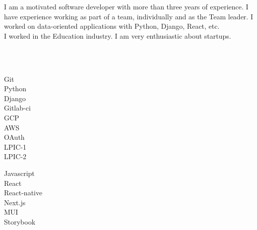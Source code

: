 \documentclass[9pt]{developercv}
\begin{document}
\begin{minipage}[t]{1\textwidth}
	\vspace{-\baselineskip}
	I am a motivated software developer with more than three years of experience.
	I have experience working as part of a team, individually and as the Team leader.
	I worked on data-oriented applications with Python, Django, React, etc.\\
	I worked in the Education industry. I am very enthusiastic about startups.
\end{minipage}

\\\\
\begin{minipage}[t]{0.49\textwidth}
	\Large
	\vspace{-\baselineskip}

	\faCircle \; {Git}\\
	\faCircle \; {Python}\\
	\faCircle \; {Django}\\
	\faCircle \; {Gitlab-ci}\\
	\faCircle \; {GCP}\\
	\faCircle \; {AWS}\\
	\faCircle \; {OAuth}\\
	\faCircle \; {LPIC-1}\\
	\faCircle \; {LPIC-2}\\
\end{minipage}
\begin{minipage}[t]{0.50\textwidth}
	\Large
	\vspace{-\baselineskip}

	\faCircle \; {Javascript}\\
	\faCircle \; {React}\\
	\faCircle \; {React-native}\\
	\faCircle \; {Next.js}\\
	\faCircle \; {MUI}\\
	\faCircle \; {Storybook}\\
\end{minipage}
\end{document}
